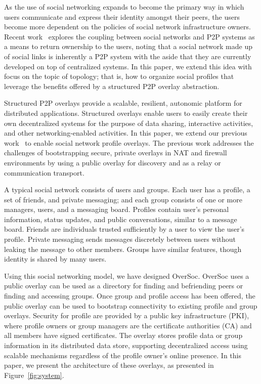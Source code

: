\documentclass{IEEEtran}
\begin{document}
As the use of social networking expands to become the primary way in which
users communicate and express their identity amongst their peers, the users
become more dependent on the policies of social network infrastructure owners.
Recent work~\cite{p2p_socialnetwork} explores the coupling between social
networks and P2P systems as a means to return ownership to the users, noting
that a social network made up of social links is inherently a P2P system with
the aside that they are currently developed on top of centralized systems.  In
this paper, we extend this idea with focus on the topic of topology; that is,
how to organize social profiles that leverage the benefits offered by a
structured P2P overlay abstraction.

Structured P2P overlays provide a scalable, resilient, autonomic platform for
distributed applications.  Structured overlays enable users to easily create
their own decentralized systems for the purpose of data sharing, interactive
activities, and other networking-enabled activities.  In this paper, we extend
our previous work~\cite{vpo} to enable social network profile overlays.  The
previous work addresses the challenges of bootstrapping secure, private
overlays in NAT and firewall environments by using a public overlay for
discovery and as a relay or communication transport.  

A typical social network consists of users and groups.  Each user has a
profile, a set of friends, and private messaging; and each group consists of
one or more managers, users, and a messaging board.  Profiles contain user's
personal information, status updates, and public conversations, similar to a
message board.  Friends are individuals trusted sufficiently by a user to view
the user's profile.  Private messaging sends messages discretely between users
without leaking the message to other members.  Groups have similar features,
though identity is shared by many users.

Using this social networking model, we have designed OverSoc.  OverSoc uses a
public overlay can be used as a directory for finding and befriending peers or
finding and accessing groups.  Once group and profile access has been offered,
the public overlay can be used to bootstrap connectivity to existing profile
and group overlays.  Security for profile are provided by a public key
infrastructure (PKI), where profile owners or group managers are the
certificate authorities (CA) and all members have signed certificates.  The
overlay stores profile data or group information in its distributed data store,
supporting decentralized access using scalable mechanisms regardless of the
profile owner's online presence.  In this paper, we present the architecture of
these overlays, as presented in Figure~\ref{fig:system}.
\end{document}
